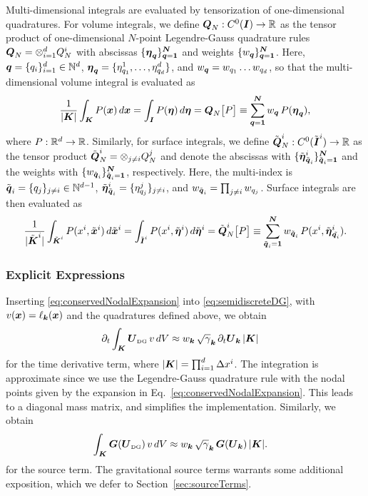 \documentclass[10pt,preprint]{aastex}
\begin{document}
Multi-dimensional integrals are evaluated by tensorization of one-dimensional quadratures.  
For volume integrals, we define $\boldsymbol{Q}_{N}:C^{0}(\boldsymbol{I})\to\mathbb{R}$ as the tensor product of one-dimensional $N$-point Legendre-Gauss quadrature rules $\boldsymbol{Q}_{N}=\otimes_{i=1}^{d}Q_{N}^{i}$ with abscissas $\{\boldsymbol{\eta}_{\boldsymbol{q}}\}_{\boldsymbol{q}=\boldsymbol{1}}^{\boldsymbol{N}}$ and weights $\{w_{\boldsymbol{q}}\}_{\boldsymbol{q}=\boldsymbol{1}}^{\boldsymbol{N}}$.  
Here, $\boldsymbol{q}=\{q_{i}\}_{i=1}^{d}\in\mathbb{N}^{d}$, $\boldsymbol{\eta}_{\boldsymbol{q}}=\{\eta_{q_{1}}^{1},\ldots,\eta_{q_{d}}^{d}\}$, and $w_{\boldsymbol{q}}=w_{q_{1}}\ldots w_{q_{d}}$, so that the multi-dimensional volume integral is evaluated as
\begin{equation}
  \frac{1}{|\boldsymbol{K}|}\int_{\boldsymbol{K}}P(\boldsymbol{x})\,d\boldsymbol{x}
  =\int_{\boldsymbol{I}}P(\boldsymbol{\eta})\,d\boldsymbol{\eta}
  =\boldsymbol{Q}_{N}\big[P\big]
  \equiv\sum_{\boldsymbol{q}=\boldsymbol{1}}^{\boldsymbol{N}}w_{\boldsymbol{q}}\,P(\boldsymbol{\eta}_{\boldsymbol{q}}),
\end{equation}
where $P:\mathbb{R}^{d}\to\mathbb{R}$.  
Similarly, for surface integrals, we define $\tilde{\boldsymbol{Q}}_{N}^{i}:C^{0}(\tilde{\boldsymbol{I}}^{i})\to\mathbb{R}$ as the tensor product $\tilde{\boldsymbol{Q}}_{N}^{i}=\otimes_{j\ne i}Q_{N}^{j}$ and denote the abscissas with $\{\tilde{\boldsymbol{\eta}}_{\tilde{\boldsymbol{q}}_{i}}^{i}\}_{\tilde{\boldsymbol{q}}_{i}=\boldsymbol{1}}^{\boldsymbol{N}}$ and the weights with $\{w_{\tilde{\boldsymbol{q}}_{i}}\}_{\tilde{\boldsymbol{q}}_{i}=\boldsymbol{1}}^{\boldsymbol{N}}$, respectively.  
Here, the multi-index is $\tilde{\boldsymbol{q}}_{i}=\{q_{j}\}_{j\ne i}\in\mathbb{N}^{d-1}$, $\tilde{\boldsymbol{\eta}}_{\tilde{\boldsymbol{q}}_{i}}^{i}=\{\eta_{q_{j}}^{j}\}_{j\ne i}$, and $w_{\tilde{\boldsymbol{q}}_{i}}=\prod_{j\ne i}w_{q_{j}}$.  
Surface integrals are then evaluated as
\begin{equation}
  \frac{1}{|\tilde{\boldsymbol{K}}^{i}|}\int_{\tilde{\boldsymbol{K}}^{i}}P(x^{i},\tilde{\boldsymbol{x}}^{i})\,d\tilde{\boldsymbol{x}}^{i}
  =\int_{\tilde{\boldsymbol{I}}^{i}}P(x^{i},\tilde{\boldsymbol{\eta}}^{i})\,d\tilde{\boldsymbol{\eta}}^{i}
  =\tilde{\boldsymbol{Q}}_{N}^{i}\big[P\big]
  \equiv\sum_{\tilde{\boldsymbol{q}}_{i}=\boldsymbol{1}}^{\boldsymbol{N}}w_{\tilde{\boldsymbol{q}}_{i}}\,P(x^{i},\tilde{\boldsymbol{\eta}}_{\tilde{\boldsymbol{q}_{i}}}^{i}).  
\end{equation}

\subsubsection{Explicit Expressions}

Inserting \eqref{eq:conservedNodalExpansion} into \eqref{eq:semidiscreteDG}, with $v(\boldsymbol{x})=\ell_{\boldsymbol{k}}(\boldsymbol{x})$ and the quadratures defined above, we obtain
\begin{align}
  \partial_{t}{}\int_{\boldsymbol{K}}\boldsymbol{U}_{\mbox{\tiny DG}}\,v\,dV
  &\approx w_{\boldsymbol{k}}\,\sqrt{\gamma}_{\boldsymbol{k}}\,\partial_{t}{}\boldsymbol{U}_{\boldsymbol{k}}\,|\boldsymbol{K}|
\end{align}
for the time derivative term, where $|\boldsymbol{K}|=\prod_{i=1}^{d}\Delta x^{i}$.  
The integration is approximate since we use the Legendre-Gauss quadrature rule with the nodal points given by the expansion in Eq.~\eqref{eq:conservedNodalExpansion}.  
This leads to a diagonal mass matrix, and simplifies the implementation.  
Similarly, we obtain
\begin{align}
  \int_{\boldsymbol{K}}\boldsymbol{G}(\boldsymbol{U}_{\mbox{\tiny DG}})\,v\,dV
  &\approx w_{\boldsymbol{k}}\,\sqrt{\gamma}_{\boldsymbol{k}}\,\boldsymbol{G}(\boldsymbol{U}_{\boldsymbol{k}})\,|\boldsymbol{K}|.
\end{align}
for the source term.  
The gravitational source terms warrants some additional exposition, which we defer to Section~\ref{sec:sourceTerms}.  
\end{document}
